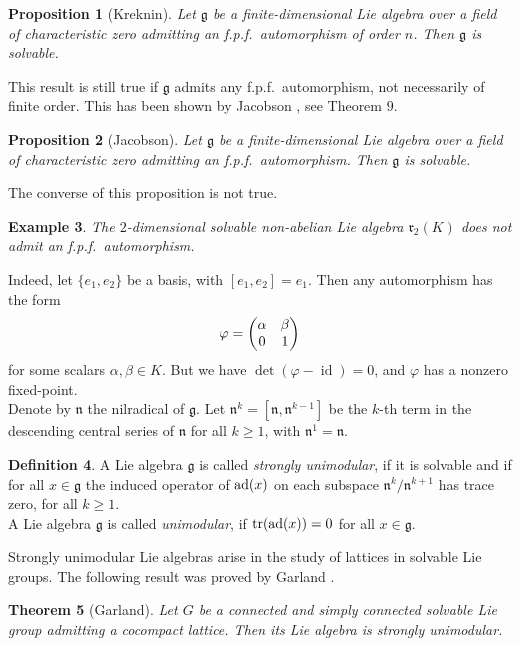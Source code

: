 \documentclass[12pt]{amsart}
\newtheorem{thm}{Theorem}[section]
\newtheorem{prop}[thm]{Proposition}
\newtheorem{ex}[thm]{Example}
\theoremstyle{definition}
\newtheorem{defi}[thm]{Definition}
\theoremstyle{remark}
\DeclareMathOperator{\id}{id}
\newcommand{\tr}{\mathop{\rm tr}}
\newcommand{\ad}{{\rm ad}}
\newcommand{\Lg}{\mathfrak{g}}
\newcommand{\Ln}{\mathfrak{n}}
\newcommand{\Lr}{\mathfrak{r}}
\newcommand{\al}{\alpha}
\newcommand{\be}{\beta}
\renewcommand{\phi}{\varphi}
\begin{document}
\begin{prop}[Kreknin]
Let $\Lg$ be a finite-dimensional Lie algebra over a field of characteristic zero admitting
an f.p.f.\ automorphism of order $n$. Then $\Lg$ is solvable.
\end{prop}

This result is still true if $\Lg$ admits any f.p.f.\ automorphism, not necessarily of finite order.
This has been shown by Jacobson \cite{JAC}, see Theorem $9$.

\begin{prop}[Jacobson]
Let $\Lg$ be a finite-dimensional Lie algebra over a field of characteristic zero admitting
an f.p.f.\ automorphism. Then $\Lg$ is solvable.
\end{prop}

The converse of this proposition is not true.

\begin{ex}\label{2.6}
The $2$-dimensional solvable non-abelian Lie algebra $\Lr_2(K)$ does not admit an f.p.f.\ automorphism.
\end{ex}

Indeed, let $\{e_1,e_2\}$ be a basis, with $[e_1,e_2]=e_1$. Then any automorphism
has the form
\[
\phi=\begin{pmatrix} \al & \be \cr 0 & 1 \end{pmatrix}
\]
for some scalars $\al,\be \in K$. But we have $\det(\phi-\id)=0$, and $\phi$ has a nonzero fixed-point. \\[0.2cm]
Denote by $\Ln$ the nilradical of $\Lg$. Let $\Ln^k=[\Ln,\Ln^{k-1}]$ be the $k$-th term in the descending central
series of $\Ln$ for all $k\ge 1$, with $\Ln^1=\Ln$.

\begin{defi}\label{2.7}
A Lie algebra $\Lg$ is called {\em strongly unimodular}, if it is solvable and if for all $x\in \Lg$ the
induced operator of $\ad(x)$ on each subspace $\Ln^k/\Ln^{k+1}$ has trace zero, for all $k\ge 1$. \\
A Lie algebra $\Lg$ is called {\em unimodular}, if $\tr(\ad (x))=0$ for all $x\in \Lg$.
\end{defi}  

Strongly unimodular Lie algebras arise in the study of lattices in solvable Lie groups.
The following result was proved by Garland \cite{GAR}.

\begin{thm}[Garland]
Let $G$ be a connected and simply connected solvable Lie group admitting a cocompact lattice.
Then its Lie algebra is strongly unimodular.
\end{thm}
\end{document}
